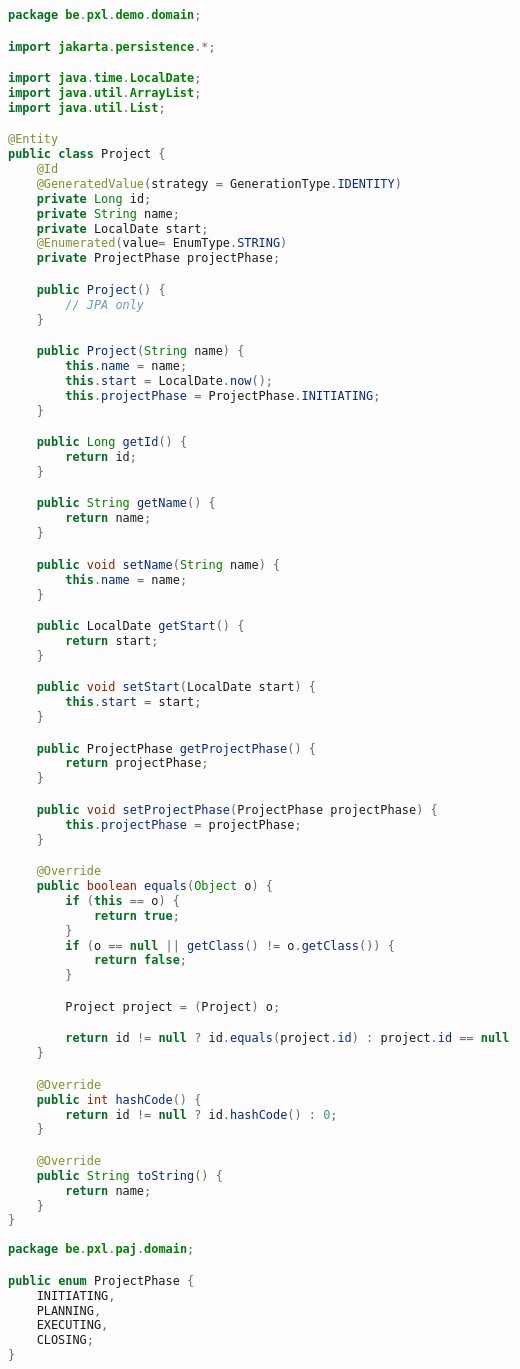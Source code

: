 \begin{lstlisting}[frame=single, language=java]
package be.pxl.demo.domain;

import jakarta.persistence.*;

import java.time.LocalDate;
import java.util.ArrayList;
import java.util.List;

@Entity
public class Project {
	@Id
	@GeneratedValue(strategy = GenerationType.IDENTITY)
	private Long id;
	private String name;
	private LocalDate start;
	@Enumerated(value= EnumType.STRING)
	private ProjectPhase projectPhase;

	public Project() {
	    // JPA only
	}

	public Project(String name) {
		this.name = name;
		this.start = LocalDate.now();
		this.projectPhase = ProjectPhase.INITIATING;
	}

	public Long getId() {
		return id;
	}

	public String getName() {
		return name;
	}

	public void setName(String name) {
		this.name = name;
	}

	public LocalDate getStart() {
		return start;
	}

	public void setStart(LocalDate start) {
		this.start = start;
	}

	public ProjectPhase getProjectPhase() {
		return projectPhase;
	}

	public void setProjectPhase(ProjectPhase projectPhase) {
		this.projectPhase = projectPhase;
	}

	@Override
	public boolean equals(Object o) {
		if (this == o) {
			return true;
		}
		if (o == null || getClass() != o.getClass()) {
			return false;
		}

		Project project = (Project) o;

		return id != null ? id.equals(project.id) : project.id == null;
	}

	@Override
	public int hashCode() {
		return id != null ? id.hashCode() : 0;
	}

	@Override
	public String toString() {
		return name;
	}
}

\end{lstlisting}

\begin{lstlisting}[frame=single, language=java]
package be.pxl.paj.domain;

public enum ProjectPhase {
	INITIATING,
	PLANNING,
	EXECUTING,
	CLOSING;
}
\end{lstlisting}

